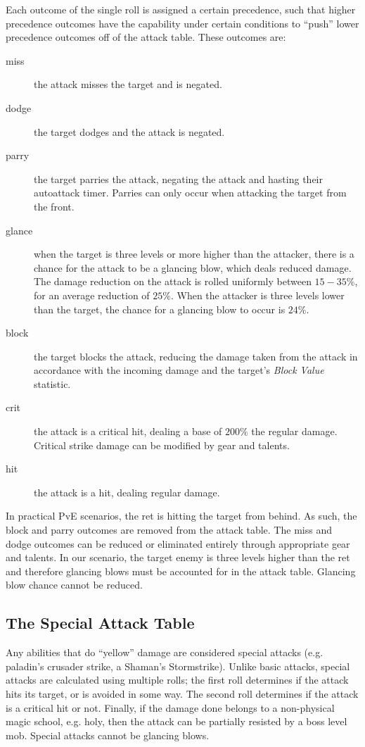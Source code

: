 \documentclass[letterpaper,11pt]{article}
\begin{document}
	Each outcome of the single roll is assigned a certain precedence, such that higher precedence outcomes have the capability under certain conditions to ``push'' lower precedence outcomes off of the attack table.
	These outcomes are:
	\begin{description}
		\item[miss] the attack misses the target and is negated.
		\item[dodge] the target dodges and the attack is negated.
		\item[parry] the target parries the attack, negating the attack and hasting their autoattack timer. Parries can only occur when attacking the target from the front.
		\item[glance] when the target is three levels or more higher than the attacker, there is a chance for the attack to be a glancing blow, which deals reduced damage. The damage reduction on the attack is rolled uniformly between $15 - 35 \%$, for an average reduction of $25\%$. When the attacker is three levels lower than the target, the chance for a glancing blow to occur is $24\%$. %
		\item[block] the target blocks the attack, reducing the damage taken from the attack in accordance with the incoming damage and the target's \emph{Block Value} statistic.
		\item[crit] the attack is a critical hit, dealing a base of $200\%$ the regular damage. Critical strike damage can be modified by gear and talents.
		\item[hit] the attack is a hit, dealing regular damage.
	\end{description}
	In practical PvE scenarios, the ret is hitting the target from behind.
	As such, the block and parry outcomes are removed from the attack table.
	The miss and dodge outcomes can be reduced or eliminated entirely through appropriate gear and talents.
	In our scenario, the target enemy is three levels higher than the ret and therefore glancing blows must be accounted for in the attack table.
	Glancing blow chance cannot be reduced.
	
	\subsection{The Special Attack Table}
	Any abilities that do ``yellow'' damage are considered special attacks (e.g. paladin's crusader strike, a Shaman's Stormstrike).
	Unlike basic attacks, special attacks are calculated using multiple rolls; the first roll determines if the attack hits its target, or is avoided in some way.
	The second roll determines if the attack is a critical hit or not.
	Finally, if the damage done belongs to a non-physical magic school, e.g. holy, then the attack can be partially resisted by a boss level mob.
	Special attacks cannot be glancing blows.
	
\end{document}
